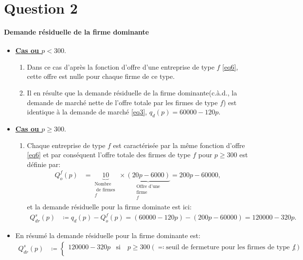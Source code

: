   \section{Question 2}
\frame{\sectionpage}
\begin{frame}
  [allowframebreaks]{\insertsection}
   \framesubtitle{Demande résiduelle de la firme dominante}
   \begin{itemize}
   \item \textbf{\underline{Cas ou $p< 300$}}.
   \begin{enumerate}[$\cdot$]
   \item Dans ce cas d'après la fonction d'offre d'une entreprise de type $f$ \eqref{eq6}, cette offre est nulle pour chaque firme de ce type.
   \item Il en résulte que la demande résiduelle de la firme dominante(c.à.d., la demande de marché nette de l'offre totale par les firmes de type $f$) est identique à la demande de marché \eqref{eq3}, $q_d(p) = 60000 - 120p$.
   \end{enumerate}
    \item \textbf{\underline{Cas ou $p\geq 300$}}.
    \begin{enumerate}[$\cdot$]
   \item Chaque entreprise de type $f$ est caractérisée par la même fonction d'offre \eqref{eq6} et par conséquent l'offre totale des firmes de type $f$ 
   pour $p\geq 300$ est définie par:
   \begin{align}
   Q^f_o(p) &= \underbrace{10}_{\substack{\text{Nombre}\\ \text{ de firmes }\\ f}} \times \underbrace{(20p-6000 )}_{\substack{\text{Offre d'une}\\ 
   \text{firme }\\f}} = 200p - 60000,
   \end{align}
   et la demande résiduelle pour la firme dominate est ici:
     \begin{align*}
Q_{dr}^s(p) &\coloneqq q_d(p) - Q^f_o(p) =  (60000 - 120p) -  (200p - 60000) = 120000-320p.
\end{align*}
    \end{enumerate}
    \item En résumé la demande résiduelle pour la firme dominante est:
    \begin{align}
Q_{dr}^s(p)&\coloneqq \left\{
\begin{array}{ll}
120000-320p& \text{si} \quad p\geq 300 (\eqqcolon \text{seuil de fermeture pour les firmes de type $f$}), \\

\end{array}
\end{align}
\end{itemize}
\end{frame}
